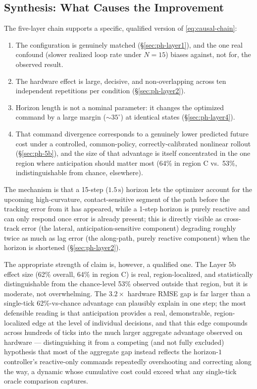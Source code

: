 \documentclass[11pt]{article}
\begin{document}
\subsection{Synthesis: What Causes the Improvement}
\label{sec:ph-synthesis}

The five-layer chain supports a specific, qualified version of
\eqref{eq:causal-chain}:
\begin{enumerate}
\item The configuration is genuinely matched (\S\ref{sec:ph-layer1}), and
  the one real confound (slower realized loop rate under $N{=}15$)
  biases against, not for, the observed result.
\item The hardware effect is large, decisive, and non-overlapping
  across ten independent repetitions per condition
  (\S\ref{sec:ph-layer2}).
\item Horizon length is not a nominal parameter: it changes the
  optimized command by a large margin ($\sim\!35^{\circ}$) at
  identical states (\S\ref{sec:ph-layer4}).
\item That command divergence corresponds to a genuinely lower
  predicted future cost under a controlled, common-policy,
  correctly-calibrated nonlinear rollout (\S\ref{sec:ph-5b}), and the
  size of that advantage is itself concentrated in the one region
  where anticipation should matter most (64\% in region C vs.\ 53\%,
  indistinguishable from chance, elsewhere).
\end{enumerate}
The mechanism is that a 15-step ($1.5\,\mathrm{s}$) horizon lets the
optimizer account for the upcoming high-curvature, contact-sensitive
segment of the path before the tracking error from it has appeared,
while a 1-step horizon is purely reactive and can only respond once
error is already present; this is directly visible as cross-track
error (the lateral, anticipation-sensitive component) degrading
roughly twice as much as lag error (the along-path, purely reactive
component) when the horizon is shortened (\S\ref{sec:ph-layer2}).

The appropriate strength of claim is, however, a qualified one. The
Layer 5b effect size (62\% overall, 64\% in region C) is real,
region-localized, and statistically distinguishable from the
chance-level 53\% observed outside that region, but it is moderate,
not overwhelming. The $3.2\times$ hardware RMSE gap is far larger than
a single-tick 62\%-vs-chance advantage can plausibly explain in one
step; the most defensible reading is that anticipation provides a
real, demonstrable, region-localized edge at the level of individual
decisions, and that this edge compounds across hundreds of ticks into
the much larger aggregate advantage observed on hardware ---
distinguishing it from a competing (and not fully excluded) hypothesis
that most of the aggregate gap instead reflects the horizon-$1$
controller's reactive-only commands repeatedly overshooting and
correcting along the way, a dynamic whose cumulative cost could exceed
what any single-tick oracle comparison captures.
\end{document}

